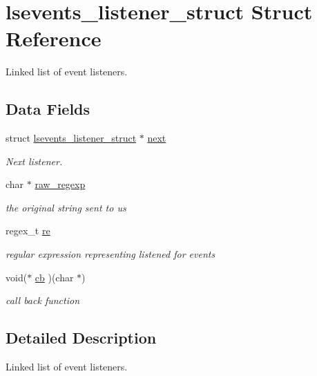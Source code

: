 \hypertarget{structlsevents__listener__struct}{\section{lsevents\-\_\-listener\-\_\-struct Struct Reference}
\label{structlsevents__listener__struct}
}


Linked list of event listeners.  


\subsection*{Data Fields}
\begin{DoxyCompactItemize}
\item 
struct \hyperlink{structlsevents__listener__struct}{lsevents\-\_\-listener\-\_\-struct} $\ast$ \hyperlink{structlsevents__listener__struct_a8aed9196b0deab84e018b96c0cc59305}{next}
\begin{DoxyCompactList}\small\item\em Next listener. \end{DoxyCompactList}\item 
char $\ast$ \hyperlink{structlsevents__listener__struct_afffe7a6889fda47a3a7a91beefed9168}{raw\-\_\-regexp}
\begin{DoxyCompactList}\small\item\em the original string sent to us \end{DoxyCompactList}\item 
regex\-\_\-t \hyperlink{structlsevents__listener__struct_a60b0f9e188a08e6101c494af89052d3f}{re}
\begin{DoxyCompactList}\small\item\em regular expression representing listened for events \end{DoxyCompactList}\item 
void($\ast$ \hyperlink{structlsevents__listener__struct_a005906c1c9f0647e6ed1fb4592d8c5d0}{cb} )(char $\ast$)
\begin{DoxyCompactList}\small\item\em call back function \end{DoxyCompactList}\end{DoxyCompactItemize}


\subsection{Detailed Description}
Linked list of event listeners. 

